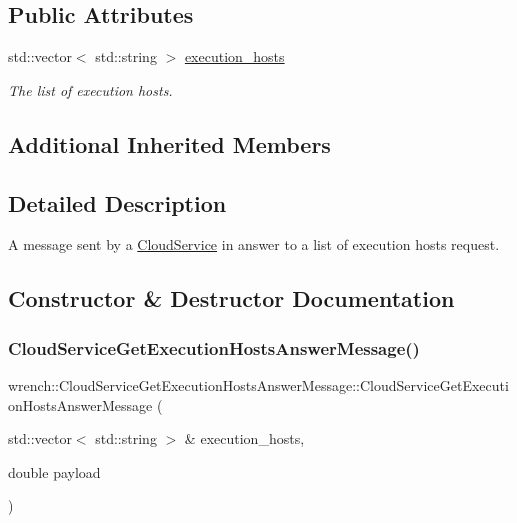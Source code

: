 \subsection*{Public Attributes}
\begin{DoxyCompactItemize}
\item 
\mbox{\label{classwrench_1_1_cloud_service_get_execution_hosts_answer_message_a67f806437e0c981b2b6a907832b6e0e7}} 
std\+::vector$<$ std\+::string $>$ \hyperlink{classwrench_1_1_cloud_service_get_execution_hosts_answer_message_a67f806437e0c981b2b6a907832b6e0e7}{execution\+\_\+hosts}
\begin{DoxyCompactList}\small\item\em The list of execution hosts. \end{DoxyCompactList}\end{DoxyCompactItemize}
\subsection*{Additional Inherited Members}


\subsection{Detailed Description}
A message sent by a \hyperlink{classwrench_1_1_cloud_service}{Cloud\+Service} in answer to a list of execution hosts request. 

\subsection{Constructor \& Destructor Documentation}
\mbox{\label{classwrench_1_1_cloud_service_get_execution_hosts_answer_message_ad93e8d5854d8dbea1a2047470d589b1a}} 
\subsubsection{\texorpdfstring{Cloud\+Service\+Get\+Execution\+Hosts\+Answer\+Message()}{CloudServiceGetExecutionHostsAnswerMessage()}}
{\footnotesize\ttfamily wrench\+::\+Cloud\+Service\+Get\+Execution\+Hosts\+Answer\+Message\+::\+Cloud\+Service\+Get\+Execution\+Hosts\+Answer\+Message (\begin{DoxyParamCaption}\item[{std\+::vector$<$ std\+::string $>$ \&}]{execution\+\_\+hosts,  }\item[{double}]{payload }\end{DoxyParamCaption})}



